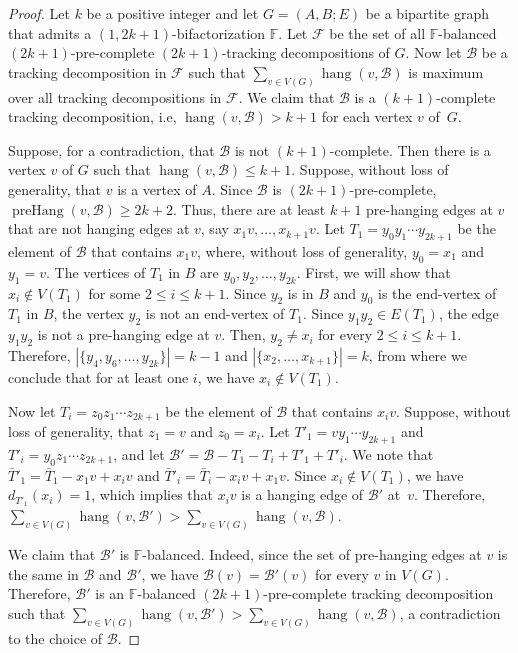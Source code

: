 \documentclass[12pt,reqno,a4paper]{amsart}
\DeclareMathOperator{\prehang}{preHang}
\DeclareMathOperator{\hang}{hang}
\newcommand{\B}{\mathcal{B}}
\begin{document}
\begin{proof}
	Let \(k\) be a positive integer and let \(G = (A,B;E)\) be a bipartite 
graph that admits a 
	\((1,2k+1)\)-bifactorization \(\mathbb{F}\). Let
$\mathcal{F}$ be the set of all $\mathbb{F}$-balanced 
	\((2k+1)\)-pre-complete $(2k+1)$-tracking decompositions of $G$. 
	Now let $\B$ be a tracking decomposition in $\mathcal{F}$ such that \(\sum_{v\in V(G)} 
\hang(v,\B)\) is maximum over all tracking decompositions in $\mathcal{F}$.
	We claim that \(\B\) is a \((k+1)\)-complete tracking decomposition,
	i.e,  \(\hang(v,\B) > k+1\) for each vertex \(v\) of~\(G\).

	Suppose, for a contradiction, that \(\B\) is not \((k+1)\)-complete.
	Then there is a vertex \(v\) of \(G\) such that \(\hang(v,\B) \leq k+1\).
	Suppose, without loss of generality, that \(v\) is a vertex of \(A\).
	Since \(\B\) is \((2k+1)\)-pre-complete, \(\prehang(v,\B) \geq 2k+2\).
	Thus, there are at least \(k+1\) pre-hanging edges at \(v\) 
	that are not hanging edges at \(v\), say \(x_1v,\ldots,x_{k+1}v\).
	Let \(T_1 = y_0y_1\cdots y_{2k+1}\) be the element of \(\B\) that contains \(x_1v\),
	where, without loss of generality, \(y_0 = x_1\) and \(y_1 = v\).
	The vertices of \(T_1\) in \(B\) are \(y_0,y_2,\ldots, y_{2k}\). 
	First, we will show that $x_i\notin V(T_1)$ for some \(2\leq i \leq k+1\). 
	Since \(y_2\) is in \(B\) and \(y_0\) is the end-vertex of \(T_1\) in 
\(B\),
	the vertex \(y_2\) is not an end-vertex of \(T_1\). 
	Since \(y_1y_2 \in E(T_1)\), the edge \(y_1y_2\) is not a pre-hanging 
edge at \(v\).
	Then, \(y_2 \neq x_i\) for every \(2\leq i\leq k+1\).
	Therefore, \(|\{y_4, y_6,\ldots,y_{2k}\}| = k-1\) and 
\(|\{x_2,\ldots,x_{k+1}\}| = k\), from where we conclude that
	for at least one \(i\), we have \(x_i \notin V(T_1)\).
	
	Now let \(T_i = z_0z_1\cdots z_{2k+1}\) be the element of \(\B\) that contains \(x_iv\).
	Suppose, without loss of generality, that \(z_1 = v\) and \(z_0 = x_i\).
	Let \(T'_1 = vy_1\cdots y_{2k+1}\) and \(T'_i = y_0z_1\cdots z_{2k+1}\),
	and let \(\B' = \B - T_1 - T_i + T'_1 + T'_i\).
	We note that \(\bar T'_1 = \bar T_1 - x_1v + x_iv\) 
	and \(\bar T'_i = \bar T_i -x_iv + x_1v\).
	Since \(x_i \notin V(T_1)\), we have \(d_{T'_1}(x_i) = 1\), which 
	implies that \(x_iv\) is a hanging edge of \(\B'\) at~$v$. Therefore, 
	\(\sum_{v\in V(G)} \hang(v,\B') > \sum_{v\in V(G)} \hang(v,\B)\).

	We claim that \(\B'\) is \(\mathbb{F}\)-balanced.
	Indeed, since the set of pre-hanging edges at \(v\) is the same in \(\B\) 
	and \(\B'\), we have \(\B(v) = \B'(v)\) for every \(v\) in \(V(G)\).
	Therefore, \(\B'\) is an \hbox{\(\mathbb{F}\)-balanced} \((2k+1)\)-pre-complete
	tracking decomposition such that 
	\(\sum_{v\in V(G)} \hang(v,\B') > \sum_{v\in V(G)} \hang(v,\B)\),	
	a contradiction to the choice of \(\B\).
	\end{proof}
\end{document}
